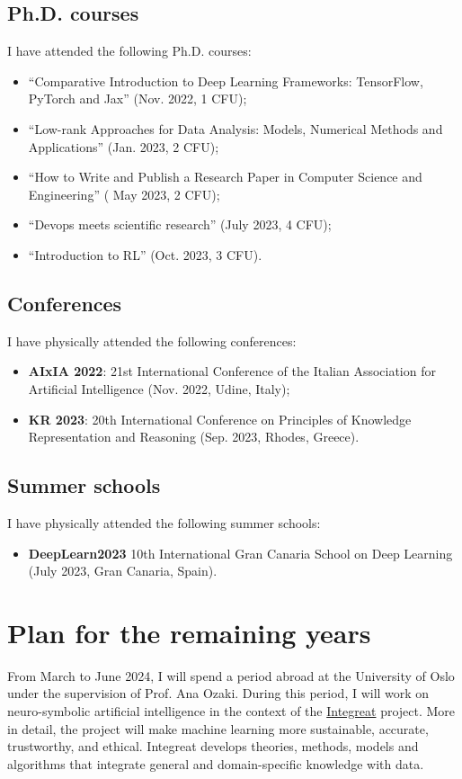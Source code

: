 \documentclass[]{scrartcl}
\begin{document}
    \subsection{Ph.D. courses}
    \label{sec:done:courses}
    I have attended the following Ph.D. courses:
    \begin{itemize}
        \item ``Comparative Introduction to Deep Learning Frameworks: TensorFlow, PyTorch and Jax'' (Nov. 2022, 1 CFU);
        \item ``Low-rank Approaches for Data Analysis: Models, Numerical Methods and Applications'' (Jan. 2023, 2 CFU);
        \item ``How to Write and Publish a Research Paper in Computer Science and Engineering'' ( May 2023, 2 CFU);
        \item ``Devops meets scientific research'' (July 2023, 4 CFU);
        \item ``Introduction to RL'' (Oct. 2023, 3 CFU).
    \end{itemize}

    \subsection{Conferences}
    \label{sec:done:conferences}
    I have physically attended the following conferences:
    \begin{itemize}
        \item \textbf{AIxIA 2022}: 21st International Conference of the Italian Association for Artificial Intelligence (Nov. 2022, Udine, Italy);
        \item \textbf{KR 2023}: 20th International Conference on Principles of Knowledge Representation and Reasoning (Sep. 2023, Rhodes, Greece).
    \end{itemize}

    \subsection{Summer schools}
    \label{sec:done:summerschools}
    I have physically attended the following summer schools:
    \begin{itemize}
        \item \textbf{DeepLearn2023} 10th International Gran Canaria School on Deep Learning (July 2023, Gran Canaria, Spain).
    \end{itemize}

    \section{Plan for the remaining years}
    \label{sec:todo}
    From March to June 2024, I will spend a period abroad at the University of Oslo under the supervision of Prof. Ana Ozaki.
    During this period, I will work on neuro-symbolic artificial intelligence in the context of the \href{https://www.integreat.no/index.html}{Integreat} project.
    More in detail, the project will make machine learning more sustainable, accurate, trustworthy, and ethical.
    Integreat develops theories, methods, models and algorithms that integrate general and domain-specific knowledge with data.
\end{document}
